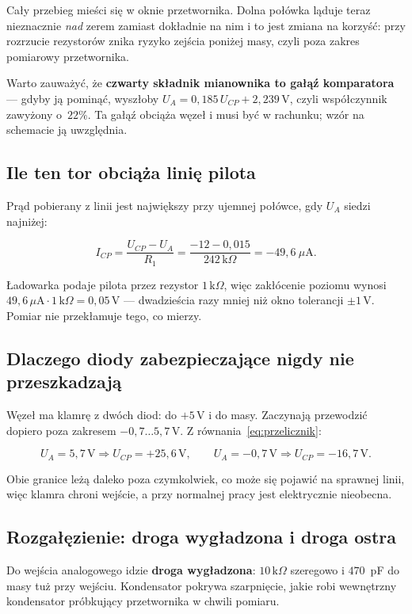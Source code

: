 \documentclass[a4paper,11pt]{article}
\newcommand{\kohm}{\,\mathrm{k}\Omega}
\newcommand{\volt}{\,\mathrm{V}}
\begin{document}
Cały przebieg mieści się w oknie przetwornika. Dolna połówka ląduje teraz
nieznacznie \emph{nad} zerem zamiast dokładnie na nim i to jest zmiana na korzyść:
przy rozrzucie rezystorów znika ryzyko zejścia poniżej masy, czyli poza zakres
pomiarowy przetwornika.

Warto zauważyć, że \textbf{czwarty składnik mianownika to gałąź komparatora} ---
gdyby ją pominąć, wyszłoby $U_A=0{,}185\,U_{CP}+2{,}239\volt$, czyli współczynnik
zawyżony o~$22\%$. Ta gałąź obciąża węzeł i musi być w rachunku; wzór na schemacie
ją uwzględnia.

\subsection{Ile ten tor obciąża linię pilota}

Prąd pobierany z linii jest największy przy ujemnej połówce, gdy $U_A$ siedzi
najniżej:

\[
I_{CP}=\frac{U_{CP}-U_A}{R_1}=\frac{-12-0{,}015}{242\kohm}=-49{,}6\ \mu\mathrm{A}.
\]

Ładowarka podaje pilota przez rezystor $1\kohm$, więc zakłócenie poziomu wynosi
$49{,}6\,\mu\mathrm{A}\cdot 1\kohm = 0{,}05\volt$ --- dwadzieścia razy mniej niż okno
tolerancji $\pm1\volt$. Pomiar nie przekłamuje tego, co mierzy.

\subsection{Dlaczego diody zabezpieczające nigdy nie przeszkadzają}

Węzeł ma klamrę z dwóch diod: do $+5\volt$ i do masy. Zaczynają przewodzić dopiero
poza zakresem $-0{,}7\ldots5{,}7\volt$. Z równania~\eqref{eq:przelicznik}:

\[
U_A=5{,}7\volt \Rightarrow U_{CP}=+25{,}6\volt,
\qquad
U_A=-0{,}7\volt \Rightarrow U_{CP}=-16{,}7\volt .
\]

Obie granice leżą daleko poza czymkolwiek, co może się pojawić na sprawnej linii,
więc klamra chroni wejście, a przy normalnej pracy jest elektrycznie nieobecna.

\subsection{Rozgałęzienie: droga wygładzona i droga ostra}

Do wejścia analogowego idzie \textbf{droga wygładzona}: $10\kohm$ szeregowo
i $470$~pF do masy tuż przy wejściu. Kondensator pokrywa szarpnięcie, jakie robi
wewnętrzny kondensator próbkujący przetwornika w chwili pomiaru.
\end{document}

